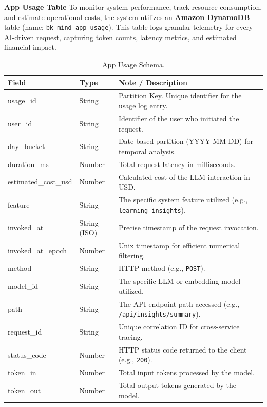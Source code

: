 \newpage

\textbf{App Usage Table}
To monitor system performance, track resource consumption, and estimate operational costs, the system utilizes an \textbf{Amazon DynamoDB} table (name: \texttt{bk\_mind\_app\_usage}). This table logs granular telemetry for every AI-driven request, capturing token counts, latency metrics, and estimated financial impact.

\begin{table}[H]
    \centering
    \caption{App Usage Schema.}
    \label{tab:app_usage}
    \begin{tabular}{llp{8cm}}
        \toprule
        \textbf{Field} & \textbf{Type} & \textbf{Note / Description} \\
        \midrule
        usage\_id & String & Partition Key. Unique identifier for the usage log entry. \\
        \midrule
        user\_id & String & Identifier of the user who initiated the request. \\
        day\_bucket & String & Date-based partition (YYYY-MM-DD) for temporal analysis. \\
        duration\_ms & Number & Total request latency in milliseconds. \\
        estimated\_cost\_usd & Number & Calculated cost of the LLM interaction in USD. \\
        feature & String & The specific system feature utilized (e.g., \texttt{learning\_insights}). \\
        invoked\_at & String (ISO) & Precise timestamp of the request invocation. \\
        invoked\_at\_epoch & Number & Unix timestamp for efficient numerical filtering. \\
        method & String & HTTP method (e.g., \texttt{POST}). \\
        model\_id & String & The specific LLM or embedding model utilized. \\
        path & String & The API endpoint path accessed (e.g., \texttt{/api/insights/summary}). \\
        request\_id & String & Unique correlation ID for cross-service tracing. \\
        status\_code & Number & HTTP status code returned to the client (e.g., \texttt{200}). \\
        token\_in & Number & Total input tokens processed by the model. \\
        token\_out & Number & Total output tokens generated by the model. \\
        \bottomrule
    \end{tabular}
\end{table}

